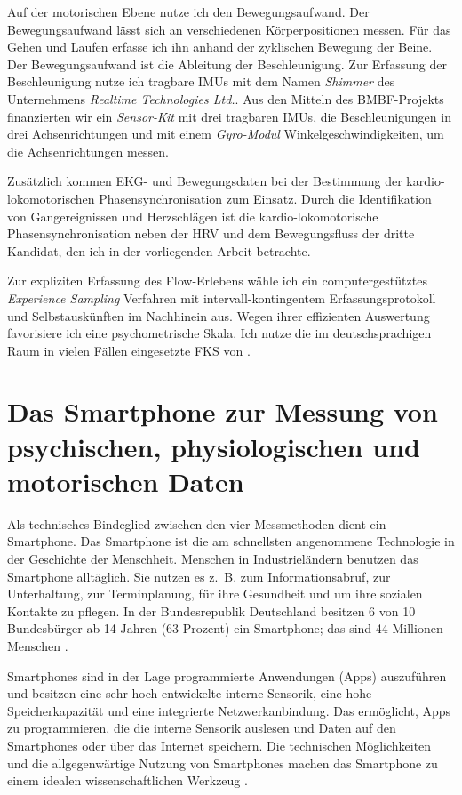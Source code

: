 Auf der motorischen Ebene nutze ich den Bewegungsaufwand. Der Bewegungsaufwand lässt sich an verschiedenen Körperpositionen messen. Für das Gehen und Laufen erfasse ich ihn anhand der zyklischen Bewegung der Beine. Der Bewegungsaufwand ist die Ableitung der Beschleunigung. Zur Erfassung der Beschleunigung nutze ich tragbare \acp{IMU} mit dem Namen \emph{Shimmer} des Unternehmens \emph{Realtime Technologies Ltd.}. Aus den Mitteln des \acs{BMBF}-Projekts finanzierten wir ein \emph{Sensor-Kit} mit drei tragbaren \acp{IMU}, die Beschleunigungen in drei Achsenrichtungen und mit einem \emph{Gyro-Modul} Winkelgeschwindigkeiten, um die Achsenrichtungen messen.

Zusätzlich kommen \ac{EKG}- und Bewegungsdaten bei der Bestimmung der kardio-lokomotorischen Phasensynchronisation zum Einsatz. Durch die Identifikation von Gangereignissen und Herzschlägen ist die kardio-lokomotorische Phasensynchronisation neben der \ac{HRV} und dem Bewegungsfluss der dritte Kandidat, den ich in der vorliegenden Arbeit betrachte.

Zur expliziten Erfassung des Flow-Erlebens wähle ich ein computergestütztes \emph{Experience Sampling} Verfahren mit intervall-kontingentem Erfassungsprotokoll und Selbstauskünften im Nachhinein aus. Wegen ihrer effizienten Auswertung favorisiere ich eine psychometrische Skala. Ich nutze die im deutschsprachigen Raum in vielen Fällen eingesetzte \ac{FKS} von \citet{Rheinberg2003}.

\section{Das Smartphone zur Messung von psychischen, physiologischen und motorischen Daten}
\label{sec:das_smartphone_zur_messung}
Als technisches Bindeglied zwischen den vier Messmethoden dient ein Smartphone. Das Smartphone ist die am schnellsten angenommene Technologie in der Geschichte der Menschheit. Menschen in Industrieländern benutzen das Smartphone alltäglich. Sie nutzen es z.~B. zum Informationsabruf, zur Unterhaltung, zur Terminplanung, für ihre Gesundheit und um ihre sozialen Kontakte zu pflegen. In der Bundesrepublik Deutschland besitzen 6 von 10 Bundesbürger ab 14 Jahren (63 Prozent) ein Smartphone; das sind 44 Millionen Menschen \citep[vgl.][]{bitkom2015}.

Smartphones sind in der Lage programmierte Anwendungen (Apps) auszuführen und besitzen eine sehr hoch entwickelte interne Sensorik, eine hohe Speicherkapazität und eine integrierte Netzwerkanbindung. Das ermöglicht, Apps zu programmieren, die die interne Sensorik auslesen und Daten auf den Smartphones oder über das Internet speichern. Die technischen Möglichkeiten und die allgegenwärtige Nutzung von Smartphones machen das Smartphone zu einem idealen wissenschaftlichen Werkzeug \citep[vgl.][]{Raento2009}.

